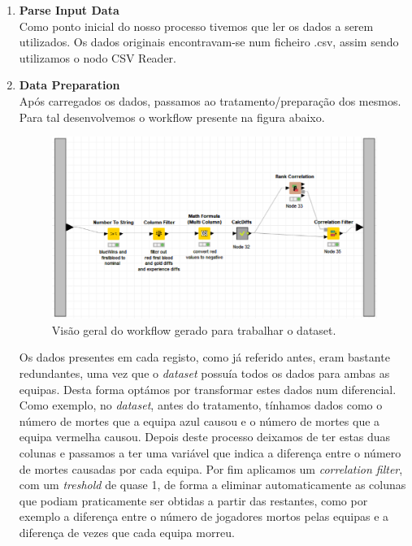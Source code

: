     \begin{enumerate}
        \item \textbf{Parse Input Data} \\
            Como ponto inicial do nosso processo tivemos que ler os dados a serem utilizados. Os dados originais encontravam-se num ficheiro .csv, assim sendo utilizamos o nodo CSV Reader.
        
        \item \textbf{Data Preparation} \\
            Após carregados os dados, passamos ao tratamento/preparação dos mesmos. Para tal desenvolvemos o workflow presente na figura abaixo.
            \begin{figure}[H]
                \centering
                \includegraphics[scale=0.30
                ]{Figures/wf_lol_data.png}
                \caption{Visão geral do workflow gerado para trabalhar o dataset.}
                \label{fig:"um"}
            \end{figure} 
            Os dados presentes em cada registo, como já referido antes, eram bastante redundantes, uma vez que o \textit{dataset} possuía todos os dados para ambas as equipas. Desta forma optámos por transformar estes dados num diferencial. Como exemplo, no \textit{dataset}, antes do tratamento, tínhamos dados como o número de mortes que a equipa azul causou e o número de mortes que a equipa vermelha causou. Depois deste processo deixamos de ter estas duas colunas e passamos a ter uma variável que indica a diferença entre o número de mortes causadas por cada equipa. Por fim aplicamos um \textit{correlation filter}, com um \textit{treshold} de quase 1, de forma a eliminar automaticamente as colunas que podiam praticamente ser obtidas a partir das restantes, como por exemplo a diferença entre o número de jogadores mortos pelas equipas e a diferença de vezes que cada equipa morreu.
        

\end{enumerate}

